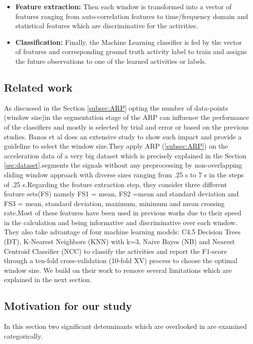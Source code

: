 \begin{itemize}
\item \textbf{Feature extraction:}
Then each window is transformed into a vector of features ranging from auto-correlation features \cite{morris2014recofit} to time/frequency domain and statistical features which are discriminative for the activities.
\item \textbf{Classification:}
Finally, the Machine Learning classifier is fed by the vector of features and corresponding ground truth activity label to train and assigns the future observations to one of the learned activities or labels.


\end{itemize}



\subsection{Related work} \label{sub:theirwork}
As discussed in the Section \ref{subsec:ARP} opting the number of data-points (window size)in the segmentation stage of the ARP can influence the performance of the classifiers and mostly is selected by trial and error or based on the previous studies. Banos et al \cite{banos2014window} does an extensive study to show such impact and provide a guideline to select the window size.They apply ARP (\ref{subsec:ARP}) on the acceleration data of a very big dataset \cite{banos2012benchmark} which is precisely explained in the Section \ref{sec:dataset}.\cite{banos2014window}segments the signals without any preprocessing by non-overlapping sliding window approach with diverse sizes ranging from .25 s to 7 s in the steps of .25 s.Regarding the feature extraction step, they consider three different feature sets(FS) namely FS1 = {mean}, FS2 ={mean and standard deviation} and FS3 = {mean, standard deviation, maximum, minimum and mean crossing rate}.Most of these features have been used in previous works due to their speed in the calculation and being informative and discriminative over each window. They also take advantage of four machine learning models: C4.5 Decision Trees (DT), K-Nearest Neighbors (KNN) with k=3, Naive Bayes (NB) and Nearest Centroid Classifier (NCC) to classify the activities and report the F1-score through a ten-fold cross-validation (10-fold XV) process to choose the optimal window size. We build on their work to remove several limitations which are explained in the next section.

\subsection{Motivation for our study} \label{our motivation}
In this section two significant determinants which are overlooked in \cite{banos2014window} are examined categorically.

